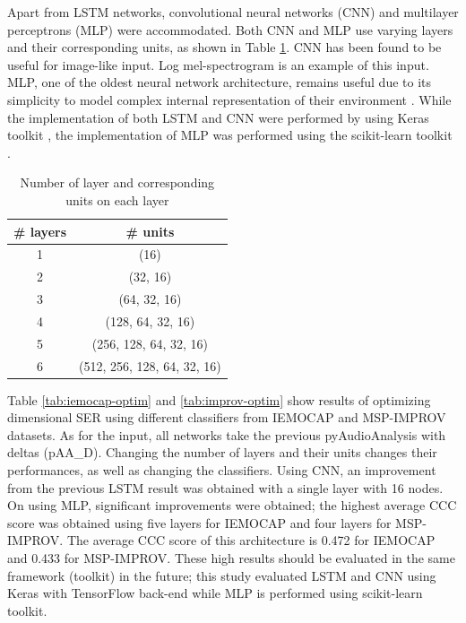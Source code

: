 Apart from LSTM networks, convolutional neural networks (CNN) and multilayer
perceptrons (MLP) were accommodated. Both CNN and MLP use varying layers and
their corresponding units, as shown in Table \ref{tab:layer}. CNN has been
found to be useful for image-like input. Log mel-spectrogram is an example of
this input. MLP, one of the oldest neural network architecture, remains useful
due to its simplicity to model complex internal representation of their
environment \cite{Hinton1989}. While the implementation of both LSTM and CNN
were performed by using Keras toolkit \cite{chollet2015keras}, the
implementation of MLP was performed using the scikit-learn toolkit
\cite{scikit-learn}.

\begin{table}
  \caption{Number of layer and corresponding units on each layer}
  \begin{center}
      \begin{tabular}{c  c}
          \hline
\# layers   &   \# units \\
\hline \hline
1   &   (16) \\
2   &   (32, 16) \\
3   &   (64, 32, 16) \\
4   &   (128, 64, 32, 16) \\
5   &   (256, 128, 64, 32, 16) \\
6   &   (512, 256, 128, 64, 32, 16) \\
          \hline
      \end{tabular}
      \label{tab:layer}
  \end{center}
\end{table} 

Table \ref{tab:iemocap-optim} and \ref{tab:improv-optim} show results of
optimizing dimensional SER using different classifiers from IEMOCAP and
MSP-IMPROV datasets. As for the input, all networks take the previous
pyAudioAnalysis with deltas (pAA\_D). Changing the number of layers and their
units changes their performances, as well as changing the classifiers. Using
CNN, an improvement from the previous LSTM result was obtained with a single
layer with 16 nodes. On using MLP, significant improvements were obtained; the
highest average CCC score was obtained using five layers for IEMOCAP and four
layers for MSP-IMPROV. The average CCC score of this architecture is 0.472 for
IEMOCAP and 0.433 for MSP-IMPROV. These high results should be evaluated in the
same framework (toolkit) in the future; this study evaluated LSTM and CNN using
Keras with TensorFlow back-end while MLP is performed using scikit-learn
toolkit.

